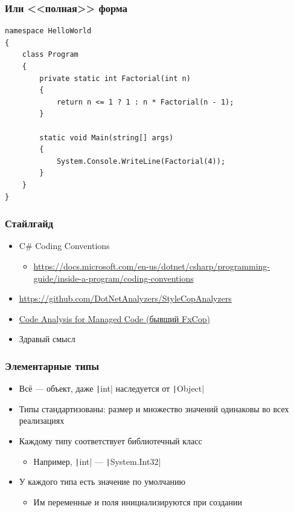 \documentclass[xetex,mathserif,serif]{beamer}
\begin{document}
    \begin{frame}[fragile]
        \frametitle{Или <<полная>> форма}
        \begin{verbatim}
namespace HelloWorld
{
    class Program
    {
        private static int Factorial(int n) 
        {
            return n <= 1 ? 1 : n * Factorial(n - 1);
        }

        static void Main(string[] args)
        {
            System.Console.WriteLine(Factorial(4));
        }
    }
}
        \end{verbatim}
    \end{frame}

    \begin{frame}
        \frametitle{Стайлгайд}
        \begin{itemize}
            \item C\# Coding Conventions
            \begin{itemize}
                \item \url{https://docs.microsoft.com/en-us/dotnet/csharp/programming-guide/inside-a-program/coding-conventions}
            \end{itemize}
            \item \url{https://github.com/DotNetAnalyzers/StyleCopAnalyzers}
            \item \href{https://msdn.microsoft.com/en-us/library/3z0aeatx.aspx}{Code Analysis for Managed Code (бывший FxCop)}
            \item Здравый смысл
        \end{itemize}
    \end{frame}

    \begin{frame}
        \frametitle{Элементарные типы}
        \begin{itemize}
            \item Всё --- объект, даже \texttt|int| наследуется от \texttt|Object|
            \item Типы стандартизованы: размер и множество значений одинаковы во всех реализациях
            \item Каждому типу соответствует библиотечный класс
            \begin{itemize}
                \item Например, \texttt|int| --- \texttt|System.Int32|
            \end{itemize}
            \item У каждого типа есть значение по умолчанию
            \begin{itemize}
                \item Им переменные и поля инициализируются при создании
            \end{itemize}
        \end{itemize}
    \end{frame}
\end{document}
